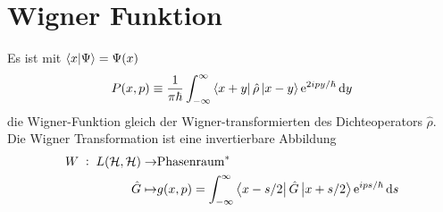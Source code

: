 \section{Wigner Funktion}
\label{sec:wignerfunktion}
Es ist mit $\bra{x}\ket{\Psi} = \Psi(x)$
\begin{equation}
  P(x,p) \equiv \frac{1}{\pi\hbar} \int_{-\infty}^{\infty} \bra{x+y}\hat{\rho} \ket{x-y} \text{e}^{2ipy/\hbar} \mathop{}\!\mathrm{d} y
\end{equation}
die Wigner-Funktion gleich der Wigner-transformierten des Dichteoperators $\hat{\rho}$. Die Wigner Transformation ist eine invertierbare Abbildung
\begin{align}
  W\; :\; L(\mathcal{H},\mathcal{H})  \rightarrow & \text{Phasenraum}^* \\
   \hat{G} \mapsto & g(x,p) = \int_{-\infty}^{\infty} \bra{x-s/2}\hat{G} \ket{x+s/2} \text{e}^{ips/\hbar} \mathop{}\!\mathrm{d} s
\end{align}
